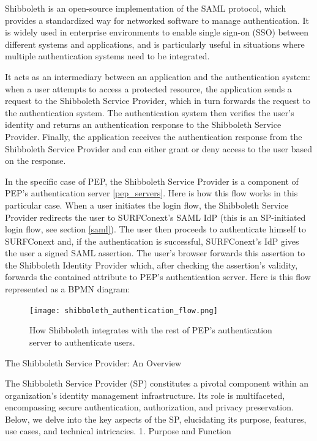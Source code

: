 \documentclass{report}
\begin{document}
Shibboleth is an open-source implementation of the SAML protocol, which provides a standardized way for networked software to manage authentication. It is widely used in enterprise
environments to enable single sign-on (SSO) between different systems and applications, and is particularly useful in situations where multiple authentication systems need to be
integrated. \par
It acts as an intermediary between an application and the authentication system: when a user attempts to access a protected resource, the application sends a request to the
Shibboleth Service Provider, which in turn forwards the request to the authentication system. The authentication system then verifies the user's identity and returns an
authentication response to the Shibboleth Service Provider. Finally, the application receives the authentication response from the Shibboleth Service Provider and can either grant or 
deny access to the user based on the response. \par
In the specific case of PEP, the Shibboleth Service Provider is a component of PEP's authentication server \ref{pep_servers}. Here is how this flow works in this particular case.
When a user initiates the login flow, the Shibboleth Service Provider redirects the user to SURFConext's SAML IdP (this is an SP-initiated login flow, see section \ref{saml}). The
user then proceeds to authenticate himself to SURFConext and, if the authentication is successful, SURFConext's IdP gives the user a signed SAML assertion. The user's browser
forwards this assertion to the Shibboleth Identity Provider which, after checking the assertion's validity, forwards the contained attribute to PEP's authentication server. Here is
this flow represented as a BPMN diagram:

\begin{figure}[H]
		\texttt{[image: shibboleth\_authentication\_flow.png]}
		\caption{How Shibboleth integrates with the rest of PEP's authentication server to authenticate users.}
\end{figure}







\iffalse
The Shibboleth Service Provider: An Overview

The Shibboleth Service Provider (SP) constitutes a pivotal component within an organization’s identity management infrastructure. Its role is multifaceted, encompassing secure authentication, authorization, and privacy preservation. Below, we delve into the key aspects of the SP, elucidating its purpose, features, use cases, and technical intricacies.
1. Purpose and Function
\end{document}
